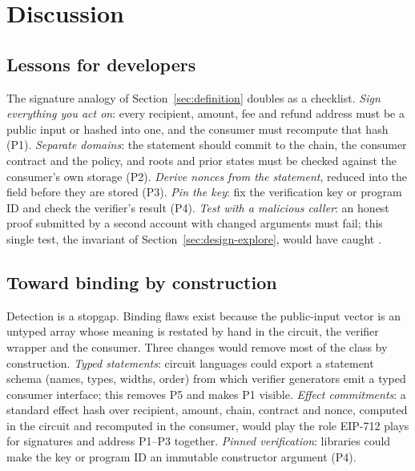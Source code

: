\section{Discussion}\label{sec:discussion}

\subsection{Lessons for developers}\label{sec:disc-lessons}

The signature analogy of Section~\ref{sec:definition} doubles as a
checklist. \emph{Sign everything you act on}: every recipient, amount, fee
and refund address must be a public input or hashed into one, and the
consumer must recompute that hash (P1). \emph{Separate domains}: the
statement should commit to the chain, the consumer contract and the policy,
and roots and prior states must be checked against the consumer's own
storage (P2). \emph{Derive nonces from the statement}, reduced into the field
before they are stored (P3). \emph{Pin the key}: fix the verification key or
program ID and check the verifier's result (P4). \emph{Test with a malicious
caller}: an honest proof submitted by a second account with changed
arguments must fail; this single test, the invariant of
Section~\ref{sec:design-explore}, would have caught .

\subsection{Toward binding by construction}\label{sec:disc-construction}

Detection is a stopgap. Binding flaws exist because the public-input vector
is an untyped array whose meaning is restated by hand in the circuit, the
verifier wrapper and the consumer. Three changes would remove most of the
class by construction. \emph{Typed statements}: circuit languages could
export a statement schema (names, types, widths, order) from which verifier
generators emit a typed consumer interface; this removes P5 and makes P1
visible. \emph{Effect commitments}: a standard effect hash over recipient,
amount, chain, contract and nonce, computed in the circuit and recomputed in
the consumer, would play the role EIP-712 plays for signatures and address
P1--P3 together. \emph{Pinned verification}: libraries could make the key or
program ID an immutable constructor argument (P4).

